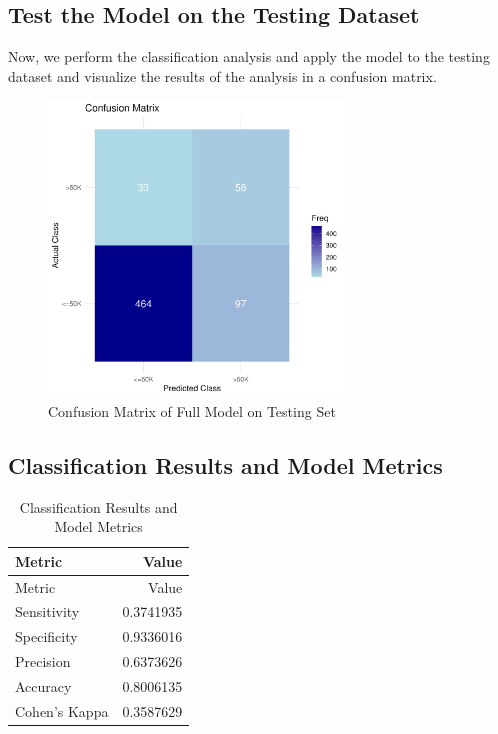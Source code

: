 \documentclass[
  letterpaper,
  DIV=11,
  numbers=noendperiod]{scrartcl}
\begin{document}
\hypertarget{test-the-model-on-the-testing-dataset}{%
\subsection{Test the Model on the Testing
Dataset}\label{test-the-model-on-the-testing-dataset}}

Now, we perform the classification analysis and apply the model to the
testing dataset and visualize the results of the analysis in a confusion
matrix.

\begin{figure}

{\centering \includegraphics[width=0.7\textwidth,height=0.7\textheight]{../results/model/conf_matrix_plot.png}

}

\caption{\label{fig-confusion-plot}Confusion Matrix of Full Model on
Testing Set}

\end{figure}

\hypertarget{classification-results-and-model-metrics}{%
\subsection{Classification Results and Model
Metrics}\label{classification-results-and-model-metrics}}

\hypertarget{tbl-classification-results}{}
\begin{longtable}[]{@{}lr@{}}
\caption{\label{tbl-classification-results}Classification Results and
Model Metrics}\tabularnewline
\toprule\noalign{}
Metric & Value \\
\midrule\noalign{}
\endfirsthead
\toprule\noalign{}
Metric & Value \\
\midrule\noalign{}
\endhead
\bottomrule\noalign{}
\endlastfoot
Sensitivity & 0.3741935 \\
Specificity & 0.9336016 \\
Precision & 0.6373626 \\
Accuracy & 0.8006135 \\
Cohen's Kappa & 0.3587629 \\
\end{longtable}
\end{document}
